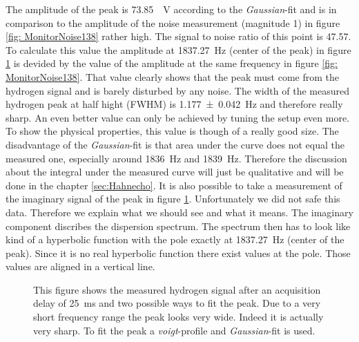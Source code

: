 The amplitude of the peak is \SI{73.85}{\mu \volt} according to the \textit{Gaussian}-fit and is in comparison to the amplitude of the noise measurement (magnitude \SI{1}{}) in figure \ref{fig: MonitorNoise138} rather high. The signal to noise ratio of this point is \SI{47.57}{}. To calculate this value the amplitude at \SI{1837.27}{\hertz} (center of the peak) in figure \ref{fig:Pulsandcollect138_delay_25_gauss} is devided by the value of the amplitude at the same frequency in figure \ref{fig: MonitorNoise138}. That value clearly shows that the peak must come from the hydrogen signal and is barely disturbed by any noise.\newline
The width of the measured hydrogen peak at half hight (FWHM) is \SI{1.177 \pm 0.042}{\hertz} and therefore really sharp. An even better value can only be achieved by tuning the setup even more. To show the physical properties, this value is though of a really good size.\newline
The disadvantage of the \textit{Gaussian}-fit is that area under the curve does not equal the measured one, especially around \SI{1836}{\hertz} and \SI{1839}{\hertz}. Therefore the discussion about the integral under the measured curve will just be qualitative and will be done in the chapter \ref{sec:Hahnecho}.\newline
It is also possible to take a measurement of the imaginary signal of the peak in figure \ref{fig:Pulsandcollect138_delay_25_gauss}. Unfortunately we did not safe this data. Therefore we explain what we should see and what it means. The imaginary component discribes the dispersion spectrum. The spectrum then has to look like kind of a hyperbolic function with the pole exactly at \SI{1837.27}{\hertz} (center of the peak). Since it is no real hyperbolic function there exist values at the pole. Those values are aligned in a vertical line.
\begin{figure}[H]
    \centering
    
    \caption[This figure shows the measured hydrogen signal after an acquisition delay of \SI{25}{\milli \second} and two possible ways to fit the peak.]{This figure shows the measured hydrogen signal after an acquisition delay of \SI{25}{\milli \second} and two possible ways to fit the peak. Due to a very short frequency range the peak looks very wide. Indeed it is actually very sharp. To fit the peak a \textit{voigt}-profile and \textit{Gaussian}-fit is used.}
    \label{fig:Pulsandcollect138_delay_25_gauss}
\end{figure}